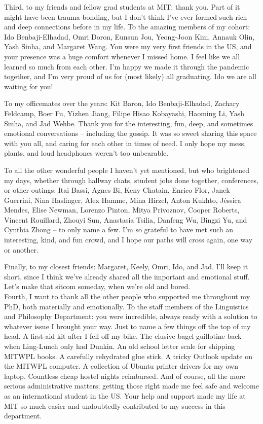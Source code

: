 Third, to my friends and fellow grad students at MIT: thank you. Part of it might have been trauma bonding, but I don't think I've ever formed such rich and deep connections before in my life.
To the amazing members of my cohort: Ido Benbaji-Elhadad, Omri Doron, Eunsun Jou, Yeong-Joon Kim, Annauk Olin, Yash Sinha, and Margaret Wang. You were my very first friends in the US, and your presence was a huge comfort whenever I missed home. I feel like we all learned so much from each other. I'm happy we made it through the pandemic together, and I'm very proud of us for (most likely) all graduating. Ido we are all waiting for you!

To my officemates over the years: Kit Baron, Ido Benbaji-Elhadad, Zachary Feldcamp, Boer Fu, Yizhen Jiang, Filipe Hisao Kobayashi, Haoming Li, Yash Sinha, and Jad Wehbe. Thank you for the interesting, fun, deep, and sometimes emotional conversations -- including the gossip. It was so sweet sharing this space with you all, and caring for each other in times of need. I only hope my mess, plants, and loud headphones weren't too unbearable.

To all the other wonderful people I haven't yet mentioned, but who brightened my days, whether through hallway chats, student jobs done together, conferences, or other outings: Itai Bassi, Agnes Bi, Keny Chatain, Enrico Flor, Janek Guerrini, Nina Haslinger, Alex Hamme, Mina Hirzel, Anton Kukhto, Jéssica Mendes, Elise Newman, Lorenzo Pinton, Mitya Privoznov, Cooper Roberts, Vincent Rouillard, Zhouyi Sun, Anastasia Tsilia, Danfeng Wu, Bingzi Yu, and Cynthia Zhong -- to only name a few. I'm so grateful to have met such an interesting, kind, and fun crowd, and I hope our paths will cross again, one way or another.

Finally, to my closest friends: Margaret, Keely, Omri, Ido, and Jad. I'll keep it short, since I think we've already shared all the important and emotional stuff. Let's make that sitcom someday, when we're old and bored.\\


Fourth, I want to thank all the other people who supported me throughout my PhD, both materially and emotionally. To the staff members of the Linguistics and Philosophy Department: you were incredible, always ready with a solution to whatever issue I brought your way. Just to name a few things off the top of my head. A first-aid kit after I fell off my bike. The elusive bagel guillotine back when Ling-Lunch only had Dunkin. An old school letter scale for shipping MITWPL books. A carefully rehydrated glue stick. A tricky Outlook update on the MITWPL computer. A collection of Ubuntu printer drivers for my own laptop. Countless cheap hostel nights reimbursed. And of course, all the more serious administrative matters; getting those right made me feel safe and welcome as an international student in the US. Your help and support made my life at MIT so much easier and undoubtedly contributed to my success in this department.


